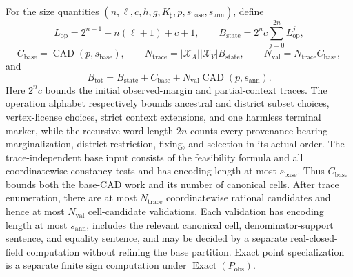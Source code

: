 For the size quantities \((n,\ell,c,h,g,K_{\sharp},p,s_{\mathrm{base}},s_{\mathrm{ann}})\), define
\[
L_{\mathrm{op}}=2^{n+1}+n(\ell+1)+c+1,
\qquad
B_{\mathrm{state}}=2^n c\sum_{j=0}^{2n}L_{\mathrm{op}}^j,
\]
\[
C_{\mathrm{base}}=\operatorname{CAD}(p,s_{\mathrm{base}}),
\qquad
N_{\mathrm{trace}}=|\mathcal X_A||\mathcal X_Y|B_{\mathrm{state}},
\qquad
N_{\mathrm{val}}=N_{\mathrm{trace}}C_{\mathrm{base}},
\]
and
\[
B_{\mathrm{tot}}
=B_{\mathrm{state}}+C_{\mathrm{base}}
+N_{\mathrm{val}}\operatorname{CAD}(p,s_{\mathrm{ann}}).
\]
Here \(2^n c\) bounds the initial observed-margin and partial-context traces. The operation alphabet respectively bounds ancestral and district subset choices, vertex-license choices, strict context extensions, and one harmless terminal marker, while the recursive word length \(2n\) counts every provenance-bearing marginalization, district restriction, fixing, and selection in its actual order. The trace-independent base input consists of the feasibility formula and all coordinatewise constancy tests and has encoding length at most \(s_{\mathrm{base}}\). Thus \(C_{\mathrm{base}}\) bounds both the base-CAD work and its number of canonical cells. After trace enumeration, there are at most \(N_{\mathrm{trace}}\) coordinatewise rational candidates and hence at most \(N_{\mathrm{val}}\) cell-candidate validations. Each validation has encoding length at most \(s_{\mathrm{ann}}\), includes the relevant canonical cell, denominator-support sentence, and equality sentence, and may be decided by a separate real-closed-field computation without refining the base partition. Exact point specialization is a separate finite sign computation under \(\operatorname{Exact}(P_{\mathrm{obs}})\).